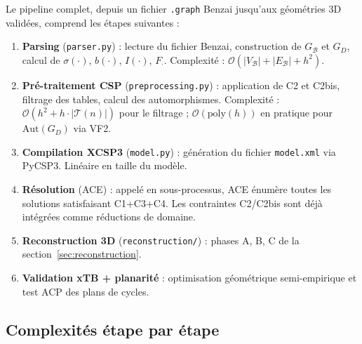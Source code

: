\documentclass[12pt,a4paper]{article}
\theoremstyle{definition}
\theoremstyle{remark}
\newcommand{\B}{\mathcal{B}}
\newcommand{\GD}{G_{\!D}}
\newcommand{\GB}{G_{\!\B}}
\newcommand{\Tn}{\mathcal{T}(n)}
\newcommand{\Aut}{\mathrm{Aut}}
\newcommand{\bigO}{\mathcal{O}}
\begin{document}
Le pipeline complet, depuis un fichier \texttt{.graph} Benzai jusqu'aux
g\'eom\'etries 3D valid\'ees, comprend les \'etapes suivantes :

\begin{enumerate}[leftmargin=*]
  \item \textbf{Parsing} (\texttt{parser.py}) : lecture du fichier
        Benzai, construction de $\GB$ et $\GD$, calcul de
        $\sigma(\cdot)$, $b(\cdot)$, $I(\cdot)$, $F_\cdot$.
        Complexit\'e : $\bigO(|V_\B| + |E_\B| + h^2)$.
  \item \textbf{Pr\'e-traitement CSP} (\texttt{preprocessing.py}) :
        application de C2 et C2bis, filtrage des tables, calcul des
        automorphismes. Complexit\'e : $\bigO(h^2 + h \cdot |\Tn|)$ pour
        le filtrage ; $\bigO(\text{poly}(h))$ en pratique pour
        $\Aut(\GD)$ via VF2.
  \item \textbf{Compilation XCSP3} (\texttt{model.py}) : g\'en\'eration
        du fichier \texttt{model.xml} via PyCSP3. Lin\'eaire en taille
        du mod\`ele.
  \item \textbf{R\'esolution} (ACE) : appel\'e en sous-processus, ACE
        \'enum\`ere toutes les solutions satisfaisant C1+C3+C4. Les
        contraintes C2/C2bis sont d\'ej\`a int\'egr\'ees comme
        r\'eductions de domaine.
  \item \textbf{Reconstruction 3D} (\texttt{reconstruction/}) : phases
        A, B, C de la section~\ref{sec:reconstruction}.
  \item \textbf{Validation xTB + planarit\'e} : optimisation
        g\'eom\'etrique semi-empirique et test ACP des plans de cycles.
\end{enumerate}

\subsection{Complexit\'es \'etape par \'etape}
\end{document}

